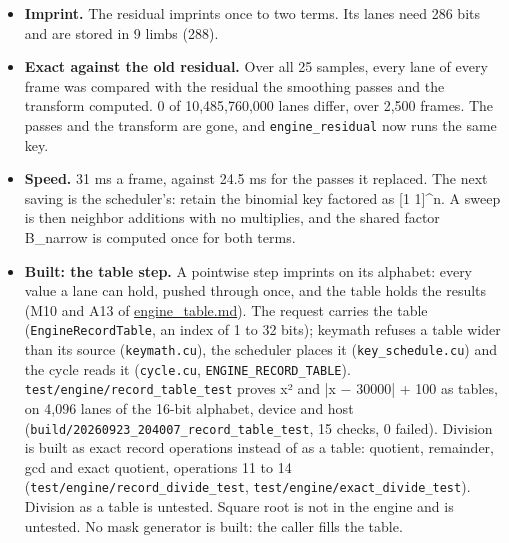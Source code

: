 \begin{itemize}
\item \textbf{Imprint.} The residual imprints once to two terms. Its lanes need 286 bits and are stored in 9 limbs (288).
\item \textbf{Exact against the old residual.} Over all 25 samples, every lane of every frame was compared with the residual the smoothing passes and the transform computed. 0 of 10,485,760,000 lanes differ, over 2,500 frames. The passes and the transform are gone, and \texttt{engine\_\allowbreak{}residual} now runs the same key.
\item \textbf{Speed.} 31 ms a frame, against 24.5 ms for the passes it replaced. The next saving is the scheduler's: retain the binomial key factored as [1 1]\textasciicircum{}n. A sweep is then neighbor additions with no multiplies, and the shared factor B\_\allowbreak{}narrow is computed once for both terms.
\item \textbf{Built: the table step.} A pointwise step imprints on its alphabet: every value a lane can hold, pushed through once, and the table holds the results (M10 and A13 of \hyperref[chap:engine-table]{engine\_\allowbreak{}table.md}). The request carries the table (\texttt{Engine\allowbreak{}Record\allowbreak{}Table}, an index of 1 to 32 bits); keymath refuses a table wider than its source (\texttt{keymath.\allowbreak{}cu}), the scheduler places it (\texttt{key\_\allowbreak{}schedule.\allowbreak{}cu}) and the cycle reads it (\texttt{cycle.\allowbreak{}cu}, \texttt{ENGINE\_\allowbreak{}RECORD\_\allowbreak{}TABLE}). \texttt{test/\allowbreak{}engine/\allowbreak{}record\_\allowbreak{}table\_\allowbreak{}test} proves x² and |x − 30000| + 100 as tables, on 4,096 lanes of the 16-bit alphabet, device and host (\texttt{build/\allowbreak{}20260923\_\allowbreak{}204007\_\allowbreak{}record\_\allowbreak{}table\_\allowbreak{}test}, 15 checks, 0 failed). Division is built as exact record operations instead of as a table: quotient, remainder, gcd and exact quotient, operations 11 to 14 (\texttt{test/\allowbreak{}engine/\allowbreak{}record\_\allowbreak{}divide\_\allowbreak{}test}, \texttt{test/\allowbreak{}engine/\allowbreak{}exact\_\allowbreak{}divide\_\allowbreak{}test}). Division as a table is untested. Square root is not in the engine and is untested. No mask generator is built: the caller fills the table.
\end{itemize}

